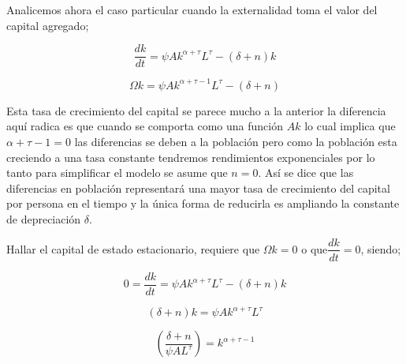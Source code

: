 \documentclass[12pt]{article}
\begin{document}


Analicemos ahora el caso particular cuando la externalidad toma el valor del capital agregado;


$$\dfrac{dk}{dt}= \psi Ak^{\alpha + \tau}L^{\tau} - (\delta + n)k$$

$$ \Omega k=  \psi Ak^{\alpha + \tau -1}L^{\tau} - (\delta + n)$$

Esta tasa de crecimiento del capital se parece mucho a la anterior la diferencia aquí radica es que cuando se comporta como una función $Ak$ lo cual implica que $\alpha + \tau -1  = 0$ las diferencias se deben a la población pero como la población esta creciendo a una tasa constante tendremos rendimientos exponenciales por lo tanto para simplificar el modelo se asume que $n = 0$. Así se dice que las diferencias en población representará una  mayor tasa de crecimiento del capital por persona en el tiempo  y la única forma de reducirla es ampliando la constante de depreciación $\delta$.

Hallar el capital de estado estacionario, requiere que $\Omega k=0$ o que$\dfrac{dk}{dt}=0$, siendo;


$$ 0 = \dfrac{dk}{dt}= \psi Ak^{\alpha + \tau}L^{\tau} - (\delta + n)k$$

$$(\delta + n)k =\psi Ak^{\alpha + \tau}L^{\tau} $$

$$ \left(\dfrac{\delta + n}{\psi AL^{\tau}} \right)= k^{\alpha + \tau -1}$$
\end{document}
